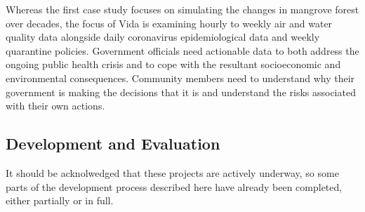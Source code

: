 \documentclass[notitlepage]{article}
\begin{document}
Whereas the first case study focuses on simulating the changes in mangrove forest over decades, the focus of Vida is examining hourly to weekly air and water quality data alongside daily coronavirus epidemiological data and weekly quarantine policies. Government officials need actionable data to both address the ongoing public health crisis and to cope with the resultant socioeconomic and environmental consequences. Community members need to understand why their government is making the decisions that it is and understand the risks associated with their own actions.

\subsection{Development and Evaluation}


It should be acknolwedged that these projects are actively underway, so some parts of the development process described here have already been completed, either partially or in full.
\end{document}

